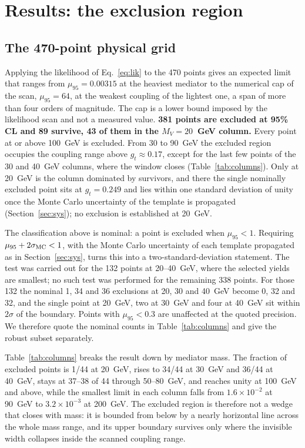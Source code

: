 \section{Results: the exclusion region}\label{sec:results}

\subsection{The 470-point physical grid}

Applying the likelihood of Eq.~\eqref{eq:lik} to the 470 points gives an expected limit that ranges from $\mu_{95}=0.00315$ at the heaviest mediator to the numerical cap of the scan, $\mu_{95}=64$, at the weakest coupling of the lightest one, a span of more than four orders of magnitude. The cap is a lower bound imposed by the likelihood scan and not a measured value. \textbf{381 points are excluded at 95\% CL and 89 survive, 43 of them in the $M_V=20$~GeV column.} Every point at or above 100~GeV is excluded. From 30 to 90~GeV the excluded region occupies the coupling range above $g_t\approx0.17$, except for the last few points of the 30 and 40~GeV columns, where the window closes (Table~\ref{tab:columns}). Only at 20~GeV is the column dominated by survivors, and there the single nominally excluded point sits at $g_t=0.249$ and lies within one standard deviation of unity once the Monte Carlo uncertainty of the template is propagated (Section~\ref{sec:sys}); no exclusion is established at 20~GeV.

The classification above is nominal: a point is excluded when $\mu_{95}<1$. Requiring $\mu_{95}+2\sigma_{\rm MC}<1$, with the Monte Carlo uncertainty of each template propagated as in Section~\ref{sec:sys}, turns this into a two-standard-deviation statement. The test was carried out for the 132 points at 20--40~GeV, where the selected yields are smallest; no such test was performed for the remaining 338 points. For those 132 the nominal 1, 34 and 36 exclusions at 20, 30 and 40~GeV become 0, 32 and 32, and the single point at 20~GeV, two at 30~GeV and four at 40~GeV sit within $2\sigma$ of the boundary. Points with $\mu_{95}<0.3$ are unaffected at the quoted precision. We therefore quote the nominal counts in Table~\ref{tab:columns} and give the robust subset separately.

Table~\ref{tab:columns} breaks the result down by mediator mass. The fraction of excluded points is 1/44 at 20~GeV, rises to 34/44 at 30~GeV and 36/44 at 40~GeV, stays at 37--38 of 44 through 50--80~GeV, and reaches unity at 100~GeV and above, while the smallest limit in each column falls from $1.6\times10^{-2}$ at 90~GeV to $3.2\times10^{-3}$ at 200~GeV. The excluded region is therefore not a wedge that closes with mass: it is bounded from below by a nearly horizontal line across the whole mass range, and its upper boundary survives only where the invisible width collapses inside the scanned coupling range.

